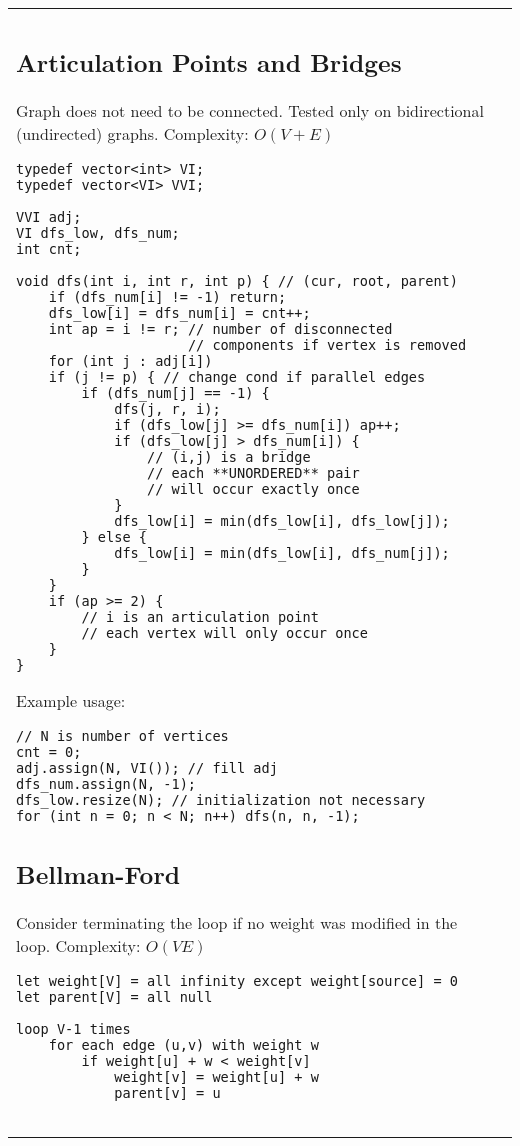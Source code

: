 \documentclass[letterpaper]{article}
\begin{document}
\vspace*{-2em}
\begin{tabular}{@{}p{9cm}p{9cm}@{}}
    \subsection{Articulation Points and Bridges}
    Graph does not need to be connected. Tested only on bidirectional (undirected) graphs. Complexity: $O\left(V + E\right)$

    \begin{lstlisting}
typedef vector<int> VI;
typedef vector<VI> VVI;

VVI adj;
VI dfs_low, dfs_num;
int cnt;

void dfs(int i, int r, int p) { // (cur, root, parent)
	if (dfs_num[i] != -1) return;
	dfs_low[i] = dfs_num[i] = cnt++;
	int ap = i != r; // number of disconnected
	                 // components if vertex is removed
	for (int j : adj[i])
	if (j != p) { // change cond if parallel edges
		if (dfs_num[j] == -1) {
			dfs(j, r, i);
			if (dfs_low[j] >= dfs_num[i]) ap++;
			if (dfs_low[j] > dfs_num[i]) {
				// (i,j) is a bridge
				// each **UNORDERED** pair
				// will occur exactly once
			}
			dfs_low[i] = min(dfs_low[i], dfs_low[j]);
		} else {
			dfs_low[i] = min(dfs_low[i], dfs_num[j]);
		}
	}
	if (ap >= 2) {
		// i is an articulation point
		// each vertex will only occur once
	}
}
\end{lstlisting}

    Example usage:
    \begin{lstlisting}
// N is number of vertices
cnt = 0;
adj.assign(N, VI()); // fill adj
dfs_num.assign(N, -1);
dfs_low.resize(N); // initialization not necessary
for (int n = 0; n < N; n++) dfs(n, n, -1);
\end{lstlisting}

    \subsection{Bellman-Ford}

    Consider terminating the loop if no weight was modified in the loop. Complexity: $O(VE)$

    \begin{lstlisting}
let weight[V] = all infinity except weight[source] = 0
let parent[V] = all null

loop V-1 times
	for each edge (u,v) with weight w
		if weight[u] + w < weight[v]
			weight[v] = weight[u] + w
			parent[v] = u


\end{lstlisting}
\end{tabular}
\end{document}
